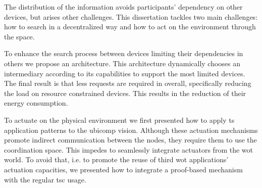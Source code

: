 The distribution of the information avoids participants' dependency on other devices, but arises other challenges.
This dissertation tackles two main challenges: how to search in a decentralized way and how to act on the environment through the space.


To enhance the search process between devices limiting their dependencies in others we propose an architecture.
This architecture dynamically chooses an intermediary according to its capabilities to support the most limited devices.
The final result is that less requests are required in overall, specifically reducing the load on resource constrained devices.
This results in the reduction of their energy consumption.


To actuate on the physical environment we first presented how to apply \ac{ts} application patterns to the \ac{ubicomp} vision.
Although these actuation mechanisms promote indirect communication between the nodes, they require them to use the coordination space.
This impedes to seamlessly integrate actuators from the \ac{wot} world. %
To avoid that, i.e. to promote the reuse of third \ac{wot} applications' actuation capacities, we presented how to integrate a proof-based mechanism with the regular \ac{tsc} usage.







